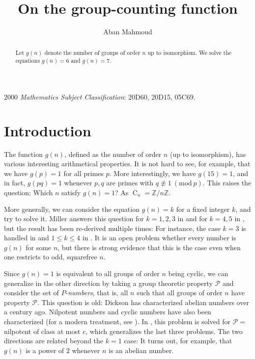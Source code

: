 \documentclass{article}
\newcommand{\cyc}[1]{\operatorname{C}_{#1}}
\newcommand{\Mod}[1]{\ (\mathrm{mod} \ #1)}
\theoremstyle{plain}
\theoremstyle{definition}
\begin{document}
\title{On the group-counting function}
\author{Aban Mahmoud}
\maketitle

\setlength{\abovedisplayskip}{2.8pt}
\setlength{\belowdisplayskip}{2.5pt}

\begin{abstract}
	Let $g(n)$ denote the number of groups of order $n$ up to isomorphism. We solve the equations $g(n) = 6$ and $g(n) = 7$.
\end{abstract}

\textup{2000} \textit{Mathematics Subject Classification}: \textup{20D60, 20D15, 05C69}.

\section{Introduction}
The function $g(n)$, defined as the number of order $n$ (up to isomorphism), has various interesting arithmetical properties. It is not hard to see, for example, that we have $g(p) = 1$ for all primes $p$. More interestingly, we have $g(15) = 1$, and in fact, $g(pq) = 1$ whenever $p, q$ are primes with $q \not\equiv 1 \Mod{p}$. This raises the question: Which $n$ satisfy $g(n) = 1$? As $\cyc{n} = \mathbb{Z}/n\mathbb{Z}$. 

More generally, we can consider the equation $g(n) = k$ for a fixed integer $k$, and try to solve it. Miller answers this question for $k = 1, 2, 3$ in {\cite{miller1}} and for $k = 4, 5$ in {\cite{miller2}}, but the result has been re-derived multiple times: For instance, the case $k = 3$ is handled in {\cite{olsson}} and $1 \le k \le 4$ in {\cite{gnumoas}}. It is an open problem whether every number is $g(n)$ for some $n$, but there is strong evidence that this is the case even when one restricts to odd, squarefree $n$. 

Since $g(n) = 1$ is equivalent to all groups of order $n$ being cyclic, we can generalize in the other direction by taking a group theoretic property $\mathcal{P}$ and consider the set of $P$-\emph{numbers}, that is, all $n$ such that all groups of order $n$ have property $\mathcal{P}$. This question is old: Dickson {\cite{dickson}} has characterized abelian numbers over a century ago. Nilpotent numbers {\cite{pazderski}} and cyclic numbers {\cite{szele}} have also been characterized (for a modern treatment, see {\cite{nilnumb}}). In {\cite{mueller}}, this problem is solved for $\mathcal{P} = $ nilpotent of class at most $c$, which generalizes the last three problems. The two directions are related beyond the $k = 1$ case: It turns out, for example, that $g(n)$ is a power of $2$ whenever $n$ is an abelian number.
\end{document}
